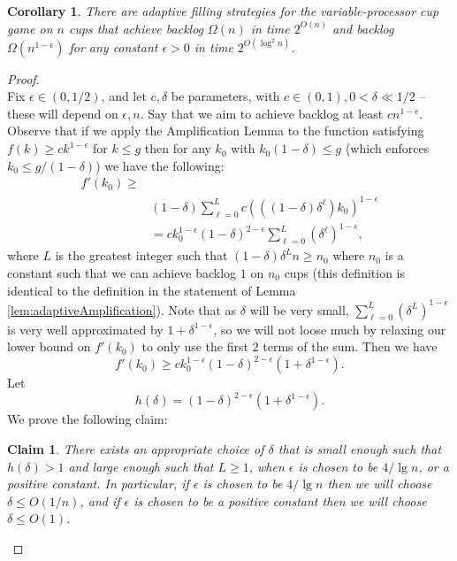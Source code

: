 \documentclass[twocolumn]{article}[10pt]
\newtheorem{clm}{Claim}
\newtheorem{corollary}{Corollary}
\begin{document}
\begin{corollary}
  \label{cor:adaptivePoly}
  There are adaptive filling strategies for the variable-processor cup game on
  $n$ cups that achieve backlog $\Omega(n)$ in time $2^{O(n)}$ and backlog
  $\Omega(n^{1-\epsilon})$ for any constant $\epsilon > 0$ in time $2^{O(\log^2 n)}$.
\end{corollary}
\begin{proof}$ $\\
  Fix $\epsilon \in (0,1/2)$, and let $c, \delta$ be parameters, with $c\in
  (0,1), 0 < \delta \ll 1/2$ -- these will depend on $\epsilon, n$.
  Say that we aim to achieve backlog at least $cn^{1-\epsilon}$.
  Observe that if we apply the Amplification Lemma to the function satisfying
  $f(k) \ge ck^{1-\epsilon}$ for $k \le g$ then for any $k_0$ with
  $k_0(1-\delta)\le g$ (which enforces $k_0 \le g/ (1-\delta)$) we have the
  following:
  \begin{align*}
  f'(k_0)\ge&\\
  &(1-\delta)\sum_{\ell=0}^L c (((1-\delta)\delta^\ell)k_0)^{1-\epsilon}\\
  &= ck_0^{1-\epsilon} (1-\delta)^{2-\epsilon} \sum_{\ell=0}^L (\delta^\ell)^{1-\epsilon},
  \end{align*}
  where $L$ is the greatest integer such that $(1-\delta)\delta^Ln \ge n_0$
  where $n_0$ is a constant such that we can achieve backlog $1$ on $n_0$ cups
  (this definition is identical to the definition in the statement of Lemma
  \ref{lem:adaptiveAmplification}).
  Note that as $\delta$ will be very small, $\sum_{\ell=0}^L
  (\delta^L)^{1-\epsilon}$ is very well approximated by
  $1+\delta^{1-\epsilon}$, so we will not loose much by relaxing our lower
  bound on $f'(k_0)$ to only use the first $2$ terms of the sum. Then we have 
  $$f'(k_0) \ge ck_0^{1-\epsilon}(1-\delta)^{2-\epsilon}(1+\delta^{1-\epsilon}).$$
  Let 
  $$h(\delta) = (1-\delta)^{2-\epsilon}(1+\delta^{1-\epsilon}).$$
  We prove the following claim:

  \begin{clm}
    \label{clm:validchoices}
    There exists an appropriate choice of $\delta$ that is small enough such
    that $h(\delta) >1$ and large enough such that $L \ge 1$, when $\epsilon$
    is chosen to be $4/\lg n$, or a positive constant. In particular, if
    $\epsilon$ is chosen to be $4/\lg n$ then we will choose $\delta \le
    O(1/n)$, and if $\epsilon$ is chosen to be a positive constant then we will
    choose $\delta \le O(1)$.
  \end{clm}


\end{proof}
\end{document}
